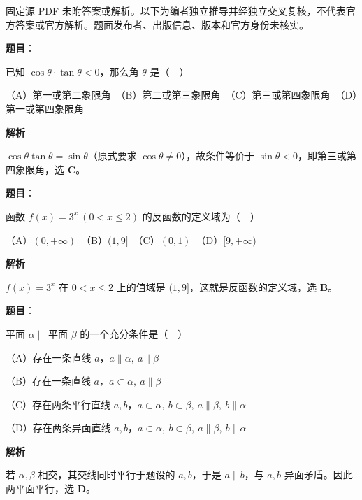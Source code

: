 

\begin{gktip}
固定源 PDF 未附答案或解析。以下为编者独立推导并经独立交叉复核，不代表官方答案或官方解析。题面发布者、出版信息、版本和官方身份未核实。
\end{gktip}


\begin{answer}

\textbf{题目}：

已知 $\cos\theta\cdot\tan\theta<0$，那么角 $\theta$ 是（　）

（A）第一或第二象限角　（B）第二或第三象限角　（C）第三或第四象限角　（D）第一或第四象限角

\textbf{解析}

$\cos\theta\tan\theta=\sin\theta$（原式要求 $\cos\theta\ne0$），故条件等价于 $\sin\theta<0$，即第三或第四象限角，选 \textbf{C}。


\end{answer}
\begin{answer}

\textbf{题目}：

函数 $f(x)=3^x\ (0<x\leq 2)$ 的反函数的定义域为（　）

（A）$(0,+\infty)$　（B）$(1,9]$　（C）$(0,1)$　（D）$[9,+\infty)$

\textbf{解析}

$f(x)=3^x$ 在 $0<x\le2$ 上的值域是 $(1,9]$，这就是反函数的定义域，选 \textbf{B}。

\gkanswer{答案：B，$(1,9]$}

\end{answer}
\begin{answer}

\textbf{题目}：

平面 $\alpha\parallel$ 平面 $\beta$ 的一个充分条件是（　）

（A）存在一条直线 $a$，$a\parallel\alpha,\ a\parallel\beta$

（B）存在一条直线 $a$，$a\subset\alpha,\ a\parallel\beta$

（C）存在两条平行直线 $a,b$，$a\subset\alpha,\ b\subset\beta,\ a\parallel\beta,\ b\parallel\alpha$

（D）存在两条异面直线 $a,b$，$a\subset\alpha,\ b\subset\beta,\ a\parallel\beta,\ b\parallel\alpha$

\textbf{解析}

若 $\alpha,\beta$ 相交，其交线同时平行于题设的 $a,b$，于是 $a\parallel b$，与 $a,b$ 异面矛盾。因此两平面平行，选 \textbf{D}。


\end{answer}

